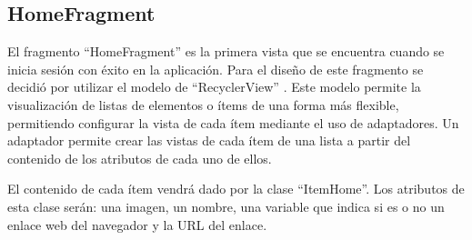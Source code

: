 \subsection{HomeFragment}

El fragmento ``HomeFragment'' es la primera vista que se encuentra cuando se inicia sesión con éxito en la aplicación. Para el diseño de este fragmento se decidió por utilizar el modelo de ``RecyclerView'' \cite{URL::recycler}. Este modelo permite la visualización de listas de elementos o ítems de una forma más flexible, permitiendo configurar la vista de cada ítem mediante el uso de adaptadores. Un adaptador permite crear las vistas de cada ítem de una lista a partir del contenido de los atributos de cada uno de ellos.

El contenido de cada ítem vendrá dado por la clase ``ItemHome''. Los atributos de esta clase serán: una imagen, un nombre, una variable que indica si es o no un enlace web del navegador y la URL del enlace.


